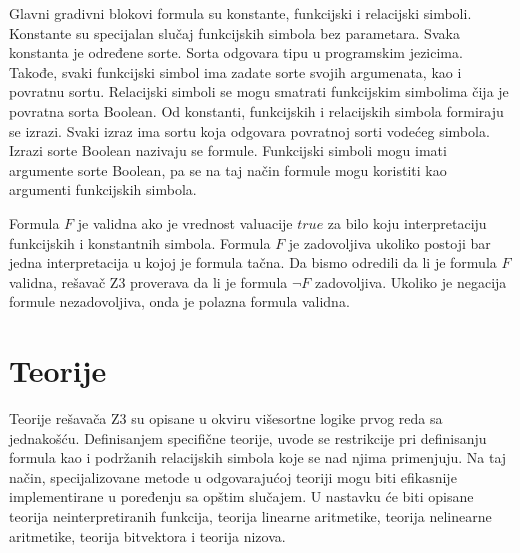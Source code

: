 \documentclass[12pt,oneside]{memoir}
\begin{document}
Glavni gradivni blokovi formula su konstante, funkcijski i relacijski simboli. Konstante su specijalan slučaj funkcijskih simbola bez parametara. Svaka konstanta je određene sorte. Sorta odgovara tipu u programskim jezicima. Takođe, svaki funkcijski simbol ima zadate sorte svojih argumenata, kao i povratnu sortu. Relacijski simboli se mogu smatrati funkcijskim simbolima čija je povratna sorta Boolean. Od konstanti, funkcijskih i relacijskih simbola formiraju se izrazi. Svaki izraz ima sortu koja odgovara povratnoj sorti vodećeg simbola. Izrazi sorte Boolean nazivaju se formule. Funkcijski simboli mogu imati argumente sorte Boolean, pa se na taj način formule mogu koristiti kao argumenti funkcijskih simbola.

Formula $F$ je validna ako je vrednost valuacije $true$ za bilo koju interpretaciju funkcijskih i konstantnih simbola. Formula $F$ je zadovoljiva ukoliko postoji bar jedna interpretacija u kojoj je formula tačna. Da bismo odredili da li je formula $F$ validna, rešavač Z3 proverava da li je formula $\lnot F$ zadovoljiva. Ukoliko je negacija formule nezadovoljiva, onda je polazna formula validna. 



\section{Teorije} \label{sec:num2}
Teorije rešavača Z3 su opisane u okviru višesortne logike prvog reda sa jednakošću.  Definisanjem specifične teorije, uvode se restrikcije pri definisanju formula kao i podržanih relacijskih simbola koje se nad njima primenjuju. Na taj način, specijalizovane metode u odgovarajućoj teoriji mogu biti efikasnije implementirane u poređenju sa opštim slučajem. U nastavku će biti opisane teorija neinterpretiranih funkcija, teorija linearne aritmetike, teorija nelinearne aritmetike, teorija bitvektora i teorija nizova.
\end{document}
